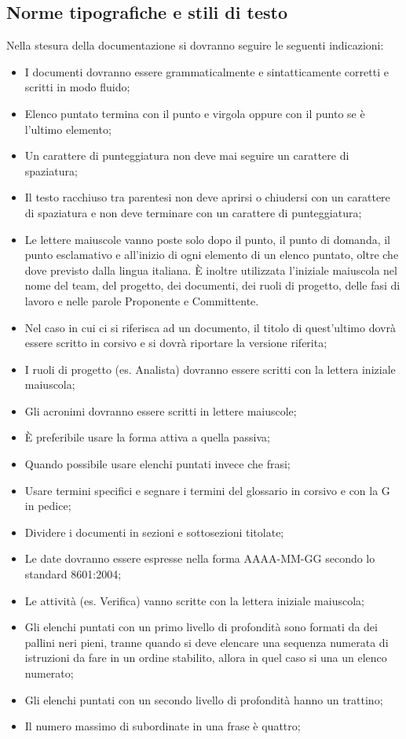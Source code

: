\subsection{Norme tipografiche e stili di testo}
\label{5.4}
Nella stesura della documentazione si dovranno seguire le seguenti indicazioni:
\begin{itemize}
\item I documenti dovranno essere grammaticalmente e sintatticamente corretti e scritti in modo fluido;
\item Elenco puntato termina con il punto e virgola oppure con il punto se è l'ultimo elemento;
\item Un carattere di punteggiatura non deve mai seguire un carattere di spaziatura;
\item Il testo racchiuso tra parentesi non deve aprirsi o chiudersi con un carattere di spaziatura e non deve terminare con un carattere di punteggiatura;
\item Le lettere maiuscole vanno poste solo dopo il punto, il punto di domanda, il punto esclamativo e all'inizio di ogni elemento di un elenco puntato, oltre che dove previsto dalla lingua italiana. È inoltre utilizzata l'iniziale maiuscola nel nome del team, del progetto, dei documenti, dei ruoli di progetto, delle fasi di lavoro e nelle parole Proponente e Committente.
\item Nel caso in cui ci si riferisca ad un documento, il titolo di quest'ultimo dovrà essere scritto in corsivo e si dovrà riportare la versione riferita;
\item I ruoli di progetto (es. Analista) dovranno essere scritti con la lettera iniziale maiuscola;
\item Gli acronimi dovranno essere scritti in lettere maiuscole;
\item \`{E} preferibile usare la forma attiva a quella passiva;
\item Quando possibile usare elenchi puntati invece che frasi;
\item Usare termini specifici e segnare i termini del glossario in corsivo e con la G in pedice;
\item Dividere i documenti in sezioni e sottosezioni titolate;
\item Le date dovranno essere espresse nella forma AAAA-MM-GG secondo lo standard  8601:2004;
\item Le attività (es. Verifica) vanno scritte con la lettera iniziale maiuscola;
\item Gli elenchi puntati con un primo livello di profondità sono formati da dei pallini neri pieni, tranne quando si deve elencare una sequenza numerata di istruzioni da fare in un ordine stabilito, allora in quel caso si una un elenco numerato; 
\item Gli elenchi puntati con un secondo livello di profondità hanno un trattino;
\item Il numero massimo di subordinate in una frase è quattro;
\end{itemize}


